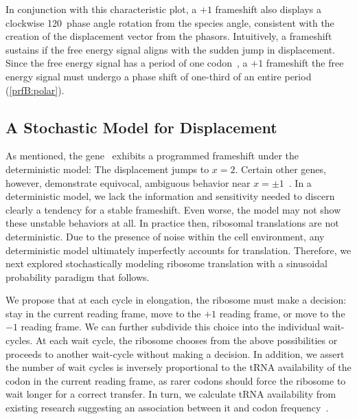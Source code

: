 \documentclass[12pt]{article}
\numberwithin{equation}{section}
\begin{document}
In conjunction with this characteristic plot, a $+1$ frameshift also displays a clockwise 120\degree\
phase angle rotation from the species angle, consistent with the
creation of the displacement vector from the phasors.
Intuitively, a frameshift sustains if the free energy signal aligns with the sudden jump in displacement.
Since the free energy signal has a period of one codon~\cite{lalit:mechanics}, a $+1$ frameshift the free energy signal
must undergo a phase shift of one-third of an entire period (\autoref{prfB:polar}).

\subsection{A Stochastic Model for Displacement}
\label{stochastic}

As mentioned, the gene \prfB\ exhibits a programmed frameshift under
the deterministic model: The displacement jumps to $x=2$.  Certain
other genes, however, demonstrate equivocal, ambiguous behavior near
$x = \pm 1$~\cite{lalit:embs}.  In a deterministic model, we lack the
information and sensitivity needed to discern clearly a tendency for a
stable frameshift. Even worse, the model may not show these unstable
behaviors at all. In practice then, ribosomal translations are not
deterministic. Due to the presence of noise within the cell
environment, any deterministic model ultimately imperfectly accounts
for translation. Therefore, we next explored stochastically modeling
ribosome translation with a sinusoidal probability paradigm that
follows.

We propose that at each cycle in elongation, the ribosome must make a
decision: stay in the current reading frame, move to the $+1$ reading
frame, or move to the $-1$ reading frame.  We can further subdivide
this choice into the individual wait-cycles.  At each wait cycle, the
ribosome chooses from the above possibilities or proceeds to another
wait-cycle without making a decision.  In addition, we assert the 
number of wait cycles is inversely proportional to the tRNA availability of 
the codon in the current reading frame, as rarer codons should force the 
ribosome to wait longer for a correct transfer. In turn, we calculate
tRNA availability from existing research suggesting an association
between it and codon frequency~\cite{ikemura}.
\end{document}
